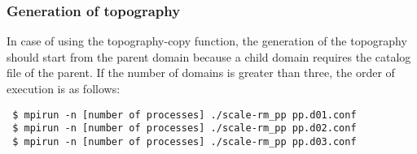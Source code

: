 \subsubsection{Generation of topography}
In case of using the topography-copy function, the generation of the topography should start from the parent domain  because a child domain requires the catalog  file of the parent. If the number of domains is greater than three, the order of execution is as follows:
\begin{verbatim}
 $ mpirun -n [number of processes] ./scale-rm_pp pp.d01.conf
 $ mpirun -n [number of processes] ./scale-rm_pp pp.d02.conf
 $ mpirun -n [number of processes] ./scale-rm_pp pp.d03.conf
\end{verbatim}


